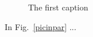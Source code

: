 \documentclass{article}
\begin{document}
\begin{figure}[!ht]
\caption{The first caption}
\end{figure}
\begin{figwindow}
\lipsum[1]

In Fig.~\ref{picinpar} ...
\end{figwindow}
\end{document}
